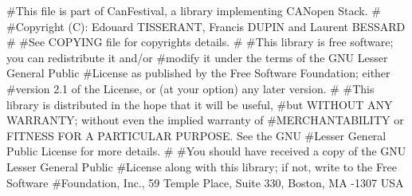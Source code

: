 \documentclass[a4paper,12pt]{book}
\newcommand{\canopen}{CANopen}
\begin{document}
{\ttfamily
\#This file is part of CanFestival, a library implementing \canopen{}
Stack. \newline
\# \newline
\#Copyright (C): Edouard TISSERANT, Francis DUPIN and Laurent BESSARD
\newline
\# \newline
\#See COPYING file for copyrights details. \newline
\# \newline
\#This library is free software; you can redistribute it and/or \newline
\#modify it under the terms of the GNU Lesser General Public \newline
\#License as published by the Free Software Foundation; either \newline
\#version 2.1 of the License, or (at your option) any later version.
\newline
\# \newline
\#This library is distributed in the hope that it will be useful,
\newline
\#but WITHOUT ANY WARRANTY; without even the implied warranty of
\newline
\#MERCHANTABILITY or FITNESS FOR A PARTICULAR PURPOSE. \space See the GNU
\newline
\#Lesser General Public License for more details. \newline
\# \newline
\#You should have received a copy of the GNU Lesser General Public
\newline
\#License along with this library; if not, write to the Free Software
\newline
\#Foundation, Inc., 59 Temple Place, Suite 330, Boston, MA
-1307 \space USA }


\bigskip
\end{document}
